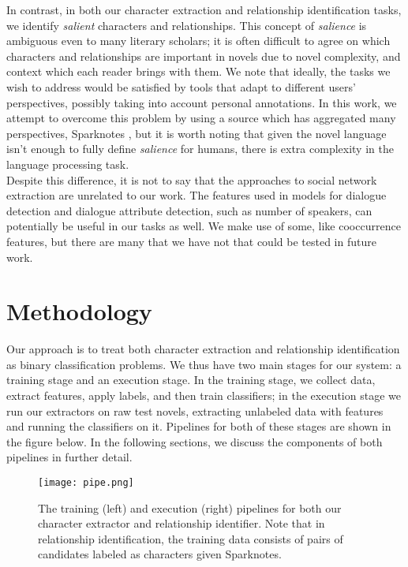 \documentclass[12pt]{article}
\begin{document}
    In contrast, in both our character extraction and relationship identification tasks, we identify
    \emph{salient} characters and relationships. This concept of \emph{salience} is ambiguous even
    to many literary scholars; it is often difficult to agree on which characters and relationships
    are important in novels due to novel complexity, and context which each reader brings with them.
    We note that ideally, the tasks we wish to address would be satisfied by tools that adapt to
    different users' perspectives, possibly taking into account personal annotations. In this work,
    we attempt to overcome this problem by using a source which has aggregated many perspectives,
    Sparknotes \cite{sparknotes}, but it is worth noting that given the novel language isn't
    enough to fully define \emph{salience} for humans, there is extra complexity in the language
    processing task. \\

    Despite this difference, it is not to say that the approaches to social network extraction are
    unrelated to our work. The features used in models for dialogue detection and dialogue attribute
    detection, such as number of speakers, can potentially be useful in our tasks as well. We make use
    of some, like cooccurrence features, but there are many that we have not that could be tested
    in future work.

\section{Methodology}

Our approach is to treat both character extraction and relationship identification as binary classification problems. 
We thus have two main stages for our system: a training stage and an execution stage. 
In the training stage, we collect data, extract features, apply labels, and then train classifiers; 
in the execution stage we run our extractors on raw test novels, extracting unlabeled data with features 
and running the classifiers on it. Pipelines for both of these stages are shown in the figure below. 
In the following sections, we discuss the components of both pipelines in further detail.\\

\begin{figure}[H]
    \centering
    \texttt{[image: pipe.png]}
    \caption{The training (left) and execution (right) pipelines for both our character extractor and relationship identifier.
        Note that in relationship identification, the training data consists of pairs of candidates labeled as
    characters given Sparknotes.}
\end{figure}
\end{document}
